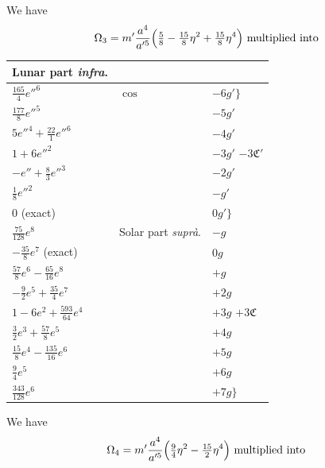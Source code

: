 \documentclass[12pt,a4paper]{article}
\theoremstyle{plain}
\begin{document}
\newpage
{} We have
\[
\Omega_{3}=m'\frac{a^{4}}{a'^{5}}\Bigl(\tfrac{5}{8}-\tfrac{15}{8}\eta^{2}+\tfrac{15}{8}\eta^{4}\Bigr)\ \text{multiplied into}
\]

\begin{center}
\begin{tabular}{|l|l|l|}
\hline
\multicolumn{1}{|c|}{Lunar part \textit{infra}.} & & \\
\hline
$\tfrac{165}{4}e''^{6}$              & $\cos$ & $-6g'\bigr\}$ \\
$\tfrac{177}{8}e''^{5}$              &        & $-5g'$ \\
$5e''^{4}+\tfrac{22}{1}e''^{6}$      &        & $-4g'$ \\
$1+6e''^{2}$                         &        & $-3g'$ \quad $-3\mathfrak{C}'$ \\
$-e''+\tfrac{8}{3}e''^{3}$           &        & $-2g'$ \\
$\tfrac{1}{8}e''^{2}$                &        & $-g'$ \\
$0$ (exact)                          &        & $0g'\bigr\}$ \\
\hline
$\tfrac{75}{128}e^{8}$                       & Solar part \textit{supr\`a}. & $-g$ \\
$-\tfrac{35}{8}e^{7}$ (exact)                &                              & $0g$ \\
$\tfrac{57}{8}e^{6}-\tfrac{65}{16}e^{8}$     &                              & $+g$ \\
$-\tfrac{9}{2}e^{5}+\tfrac{35}{4}e^{7}$      &                              & $+2g$ \\
$1-6e^{2}+\tfrac{593}{64}e^{4}$              &                              & $+3g$ \quad $+3\mathfrak{C}$ \\
$\tfrac{3}{2}e^{3}+\tfrac{57}{8}e^{5}$       &                              & $+4g$ \\
$\tfrac{15}{8}e^{4}-\tfrac{135}{16}e^{6}$    &                              & $+5g$ \\
$\tfrac{9}{4}e^{5}$                          &                              & $+6g$ \\
$\tfrac{343}{128}e^{6}$                      &                              & $+7g\bigr\}$ \\
\hline
\end{tabular}
\end{center}

\newpage
{} We have
\[
\Omega_{4}=m'\frac{a^{4}}{a'^{5}}\Bigl(\tfrac{9}{4}\eta^{2}-\tfrac{15}{2}\eta^{4}\Bigr)\ \text{multiplied into}
\]
\end{document}
